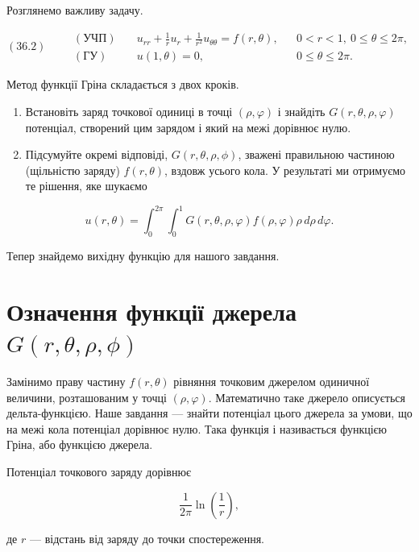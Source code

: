\documentclass[
  ukrainian,
]{article}
\begin{document}
Розглянемо важливу задачу.

\[(36.2)\qquad\begin{aligned}(\text{УЧП})\quad & u_{rr} + \frac{1}{r} u_r + \frac{1}{r^2} u_{\theta\theta} = f(r, \theta), && 0 < r < 1,\ 0 \le \theta \le 2\pi, \\(\text{ГУ})\quad & u(1, \theta) = 0, && 0 \le \theta \le 2\pi.\end{aligned}\]

Метод функції Гріна складається з двох кроків.

\begin{enumerate}
\def\labelenumi{\arabic{enumi}.}
\item
  Встановіть заряд точкової одиниці в точці \((\rho, \varphi)\) і
  знайдіть \(G(r, \theta, \rho, \varphi)\) потенціал, створений цим
  зарядом і який на межі дорівнює нулю.
\item
  Підсумуйте окремі відповіді, \(G(r, \theta, \rho, \phi)\), зважені
  правильною частиною (щільністю заряду) \(f(r, \theta)\), вздовж усього
  кола. У результаті ми отримуємо те рішення, яке шукаємо
\end{enumerate}

\[u\left(r,\theta\right) = \int_{0}^{2\pi} \int_{0}^{1} G\left(r,\theta,\rho,\varphi\right) f\left(\rho,\varphi\right)\rho\, d\rho\, d\varphi.\]

Тепер знайдемо вихідну функцію для нашого завдання.

\section{\texorpdfstring{Означення функції джерела
\(G(r, \theta, \rho, \phi)\)}{Означення функції джерела G(r, \textbackslash theta, \textbackslash rho, \textbackslash phi)}}\label{ux43eux437ux43dux430ux447ux435ux43dux43dux44f-ux444ux443ux43dux43aux446ux456ux457-ux434ux436ux435ux440ux435ux43bux430-gr-theta-rho-phi}

Замінимо праву частину \(f(r,\theta)\) рівняння точковим джерелом
одиничної величини, розташованим у точці \((\rho, \varphi)\).
Математично таке джерело описується дельта-функцією. Наше завдання ---
знайти потенціал цього джерела за умови, що на межі кола потенціал
дорівнює нулю. Така функція і називається функцією Гріна, або функцією
джерела.

Потенціал точкового заряду дорівнює

\[\frac{1}{2\pi} \ln \left( \frac{1}{r} \right),\]

де \(r\) --- відстань від заряду до точки спостереження.
\end{document}
